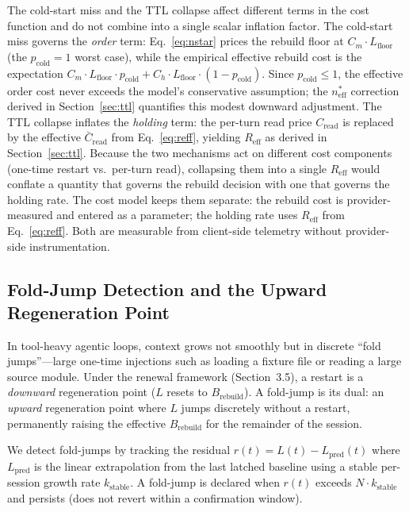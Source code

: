 \documentclass[11pt]{article}
\theoremstyle{definition}
\theoremstyle{remark}
\begin{document}
The cold-start miss and the TTL collapse affect different terms in the cost function and do not combine into a single scalar inflation factor. The cold-start miss governs the \emph{order} term: Eq.~\eqref{eq:nstar} prices the rebuild floor at $C_m \cdot L_{\text{floor}}$ (the $p_{\text{cold}}=1$ worst case), while the empirical effective rebuild cost is the expectation $C_m \cdot L_{\text{floor}} \cdot p_{\text{cold}} + C_h \cdot L_{\text{floor}} \cdot (1-p_{\text{cold}})$. Since $p_{\text{cold}} \le 1$, the effective order cost never exceeds the model's conservative assumption; the $n^*_{\text{eff}}$ correction derived in Section~\ref{sec:ttl} quantifies this modest downward adjustment. The TTL collapse inflates the \emph{holding} term: the per-turn read price $C_{\text{read}}$ is replaced by the effective $\bar{C}_{\text{read}}$ from Eq.~\ref{eq:reff}, yielding $R_{\text{eff}}$ as derived in Section~\ref{sec:ttl}. Because the two mechanisms act on different cost components (one-time restart vs.\ per-turn read), collapsing them into a single $R_{\text{eff}}$ would conflate a quantity that governs the rebuild decision with one that governs the holding rate. The cost model keeps them separate: the rebuild cost is provider-measured and entered as a parameter; the holding rate uses $R_{\text{eff}}$ from Eq.~\ref{eq:reff}. Both are measurable from client-side telemetry without provider-side instrumentation.

\subsection{Fold-Jump Detection and the Upward Regeneration Point}
\label{sec:foldjump}

In tool-heavy agentic loops, context grows not smoothly but in discrete ``fold jumps''---large one-time injections such as loading a fixture file or reading a large source module. Under the renewal framework (Section~3.5), a restart is a \emph{downward} regeneration point ($L$ resets to $B_{\text{rebuild}}$). A fold-jump is its dual: an \emph{upward} regeneration point where $L$ jumps discretely without a restart, permanently raising the effective $B_{\text{rebuild}}$ for the remainder of the session.

We detect fold-jumps by tracking the residual $r(t) = L(t) - L_{\text{pred}}(t)$ where $L_{\text{pred}}$ is the linear extrapolation from the last latched baseline using a stable per-session growth rate $k_{\text{stable}}$. A fold-jump is declared when $r(t)$ exceeds $N \cdot k_{\text{stable}}$ and persists (does not revert within a confirmation window).
\end{document}
